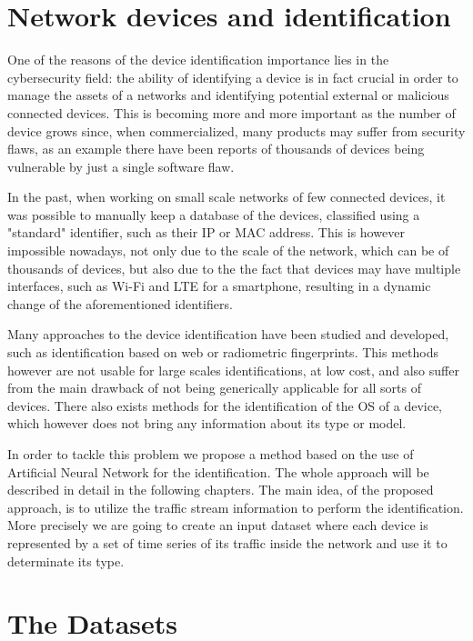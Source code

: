 \section{Network devices and identification}\label{identification}

One of the reasons of the device identification importance lies in the cybersecurity field: the ability of identifying a device is in fact crucial in order to manage the assets of a networks and identifying potential external or malicious connected devices. This is becoming more and more important as the number of device grows since, when commercialized, many products may suffer from security flaws\cite{attk1, attk2}, as an example there have been reports of thousands of devices being vulnerable by just a single software flaw\cite{flaw}.

In the past, when working on small scale networks of few connected devices, it was possible to manually keep a database of the devices, classified using a "standard" identifier, such as their IP or MAC address. This is however impossible nowadays, not only due to the scale of the network, which can be of thousands of devices, but also due to the the fact that devices may have multiple interfaces, such as Wi-Fi and LTE for a smartphone, resulting in a dynamic change of the aforementioned identifiers.

Many approaches to the device identification have been studied and developed, such as identification based on web\cite{webfingerprint1, webfingerprint2} or radiometric\cite{radiofingerprint} fingerprints. This methods however are not usable for large scales identifications, at low cost, and also suffer from the main drawback of not being generically applicable for all sorts of devices. There also exists methods for  the identification of the OS of a device\cite{idos1, idos2}, which however does not bring any information about its type or model.

In order to tackle this problem we propose a method based on the use of Artificial Neural Network for the identification. The whole approach will be described in detail in the following chapters. The main idea, of the proposed approach, is to utilize the traffic stream information to perform the identification. More precisely we are going to create an input dataset where each device is represented by a set of time series of its traffic inside the network and use it to determinate its type. 

\section{The Datasets}\label{secdata}

